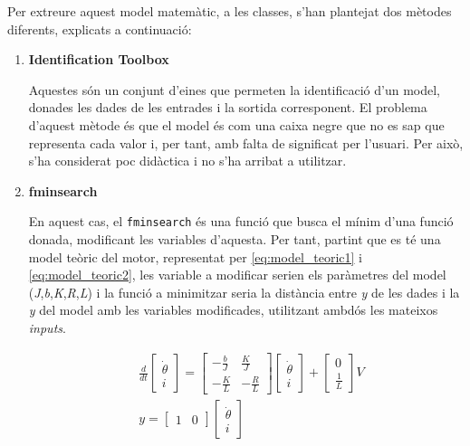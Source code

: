 \documentclass[12pt,a4paper,final,twoside,openright]{report}
\begin{document}
Per extreure aquest model matemàtic, a les classes, s'han plantejat dos mètodes diferents, explicats a continuació:
\begin{enumerate}[label=\textbf{\alph*)}]
\item \textbf{Identification Toolbox}

Aquestes són un conjunt d'eines que permeten la identificació d'un model, donades les dades de les entrades i la sortida corresponent. El problema d'aquest mètode és que el model és com una caixa negre que no es sap que representa cada valor i, per tant, amb falta de significat per l'usuari. Per això, s'ha considerat poc didàctica i no s'ha arribat a utilitzar.

\item \textbf{fminsearch}

En aquest cas, el \texttt{fminsearch} és una funció que busca el mínim d'una funció donada, modificant les variables d'aquesta. Per tant, partint que es té una model teòric del motor, representat per \eqref{eq:model_teoric1} i \eqref{eq:model_teoric2}, les variable a modificar serien els paràmetres del model (\textit{J},\textit{b},\textit{K},\textit{R},\textit{L}) i la funció a minimitzar seria la distància entre \textit{y} de les dades i la \textit{y} del model amb les variables modificades, utilitzant ambdós les mateixos \textit{inputs}.

\begin{eqnarray}
&\frac{d}{dt}\begin{bmatrix}
\dot{\theta}\\
i
\end{bmatrix} = \begin{bmatrix}
-\frac{b}{J} & \frac{K}{J}\\
-\frac{K}{L} & -\frac{R}{L}
\end{bmatrix}
\begin{bmatrix}
\dot{\theta}\\
i
\end{bmatrix} + \begin{bmatrix}
0\\
\frac{1}{L}
\end{bmatrix} V \label{eq:model_teoric1}\\
&y = \begin{bmatrix}
1 & 0
\end{bmatrix} \begin{bmatrix}
\dot{\theta}\\
i
\end{bmatrix}\label{eq:model_teoric2}
\end{eqnarray}
\end{enumerate}
\end{document}
